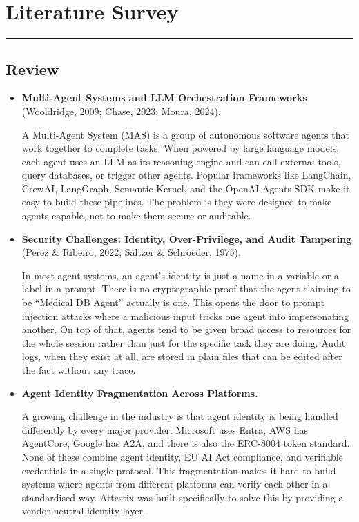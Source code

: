 \chapter{Literature Survey}
\noindent\rule{\linewidth}{2pt}

\section{Review}

\begin{itemize}

\item \textbf{Multi-Agent Systems and LLM Orchestration Frameworks} (Wooldridge, 2009; Chase, 2023; Moura, 2024).

A Multi-Agent System (MAS) is a group of autonomous software agents that work together to complete tasks. When powered by large language models, each agent uses an LLM as its reasoning engine and can call external tools, query databases, or trigger other agents. Popular frameworks like LangChain, CrewAI, LangGraph, Semantic Kernel, and the OpenAI Agents SDK make it easy to build these pipelines. The problem is they were designed to make agents capable, not to make them secure or auditable.

\item \textbf{Security Challenges: Identity, Over-Privilege, and Audit Tampering} (Perez \& Ribeiro, 2022; Saltzer \& Schroeder, 1975).

In most agent systems, an agent's identity is just a name in a variable or a label in a prompt. There is no cryptographic proof that the agent claiming to be ``Medical DB Agent'' actually is one. This opens the door to prompt injection attacks where a malicious input tricks one agent into impersonating another. On top of that, agents tend to be given broad access to resources for the whole session rather than just for the specific task they are doing. Audit logs, when they exist at all, are stored in plain files that can be edited after the fact without any trace.

\item \textbf{Agent Identity Fragmentation Across Platforms.}

A growing challenge in the industry is that agent identity is being handled differently by every major provider. Microsoft uses Entra, AWS has AgentCore, Google has A2A, and there is also the ERC-8004 token standard. None of these combine agent identity, EU AI Act compliance, and verifiable credentials in a single protocol. This fragmentation makes it hard to build systems where agents from different platforms can verify each other in a standardised way. Attestix was built specifically to solve this by providing a vendor-neutral identity layer.


\end{itemize}
